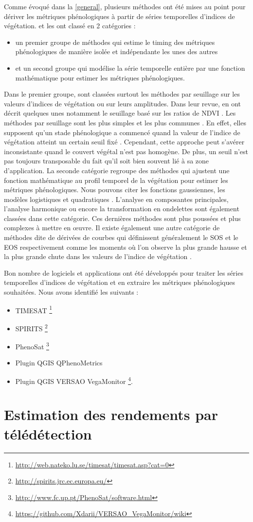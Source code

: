 Comme évoqué dans la \cref{general}, plusieurs méthodes ont été mises au point pour dériver les métriques phénologiques à partir de séries temporelles d'indices de végétation.
\citet{Beck2006} et \citet{Atzberger2013} les ont classé en 2 catégories : 
\begin{itemize}
 \item un premier groupe de méthodes qui estime le timing des métriques phénologiques de manière isolée et indépendante les unes des autres
 \item et un second groupe qui modélise la série temporelle entière par une fonction mathématique pour estimer les métriques phénologiques.
\end{itemize}
Dans le premier groupe, sont classées surtout les méthodes par seuillage sur les valeurs d'indices de végétation ou sur leurs amplitudes. Dans leur revue, \citet{deBeurs2010} en ont décrit quelques unes notamment le seuillage basé sur les ratios de NDVI \citep{White1997}. Les méthodes par seuillage sont les plus simples et les plus communes \citep{Pan2015}. En effet, elles supposent qu’un stade phénologique a commencé quand 
la valeur de l'indice de végétation atteint un certain seuil fixé \citep{Jonsson2002}. Cependant, cette approche peut s'avérer inconsistante quand le couvert végétal n'est 
pas homogène. De plus, un seuil n'est pas toujours transposable du fait qu'il soit bien souvent lié à sa zone d'application. La seconde catégorie regroupe des méthodes qui ajustent une fonction mathématique au profil temporel de la végétation pour estimer les métriques phénologiques. Nous pouvons citer les fonctions gaussiennes, les modèles logistiques et quadratiques \citep{Zhang2003,Jonsson2004}. L'analyse en composantes principales, l'analyse harmonique ou encore la transformation en ondelettes sont également classées dans cette catégorie. Ces dernières méthodes sont plus poussées et plus complexes à mettre en \oe uvre. Il existe également une autre catégorie de méthodes dite de dérivées de courbes qui définissent généralement le SOS et le EOS respectivement comme les moments où l'on observe la plus grande hausse et la plus grande chute dans les valeurs de l'indice de végétation \citep{Moulin1997,Tateishi2004}.

\vspace{5mm}

Bon nombre de logiciels et applications ont été développés pour traiter les séries temporelles d'indices de végétation et en extraire les métriques phénologiques souhaitées. 
Nous avons identifié les suivants :
\begin{itemize}
 \item TIMESAT \footnote{\url{http://web.nateko.lu.se/timesat/timesat.asp?cat=0}} \citep{Eklundh2017} 
 \item SPIRITS \footnote{\url{http://spirits.jrc.ec.europa.eu/}}
 \item PhenoSat \footnote{\url{http://www.fc.up.pt/PhenoSat/software.html}} \citep{Rodrigues2013}
 \item Plugin QGIS QPhenoMetrics \citep{Duarte2018}
 \item Plugin QGIS VERSAO VegaMonitor \footnote{\url{https://github.com/Xdarii/VERSAO_VegaMonitor/wiki}}.
\end{itemize}

\section{Estimation des rendements par télédétection}
